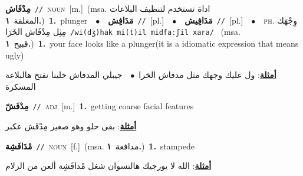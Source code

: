 \documentclass[10pt,a4paper,twoside]{article} %
\begin{document}
\begin{multicols}{2}
{\setlength\topsep{0pt}\textbf{\foreignlanguage{arabic}{مِدْفَاش}}\ {\color{gray}\texttt{//}\color{black}}\ \textsc{noun}\ [m.]\ \color{gray}(msa. \foreignlanguage{arabic}{اداة تستخدم لتنظيف البلاعات المغلقة}~\foreignlanguage{arabic}{\textbf{١.}})\color{black}\ \textbf{1.}~plunger\ \ $\bullet$\ \ \setlength\topsep{0pt}\textbf{\foreignlanguage{arabic}{مَدَافِش}}\ {\color{gray}\texttt{//}\color{black}}\ [pl.]\ \ $\bullet$\ \ \setlength\topsep{0pt}\textbf{\foreignlanguage{arabic}{مَدَافِيش}}\ {\color{gray}\texttt{//}\color{black}}\ [pl.]\ \ $\bullet$\ \ \textsc{ph.} \color{gray} \foreignlanguage{arabic}{وِجْهَك مِثِل مِدْفَاش الخَرَا}\color{black}\ {\color{gray}\texttt{/{\sffamily wi(dʒ)hak mi(t)il midfaːʃil xara}/}\color{black}}\ \color{gray} (msa. \foreignlanguage{arabic}{قبيح}~\foreignlanguage{arabic}{\textbf{١.}})\color{black}\ \textbf{1.}~your face looks like a plunger(it is a idiomatic expression that means ugly)\  \begin{flushright}\color{gray}\foreignlanguage{arabic}{\textbf{\underline{\foreignlanguage{arabic}{أمثلة}}}: ول عليك وجهك مثل مدفاش الخرا\ $\bullet$\ \  جيبلي المدفاش خلينا نفتح هالبلاعة المسكرة}\end{flushright}\color{black}} \vspace{2mm}

{\setlength\topsep{0pt}\textbf{\foreignlanguage{arabic}{مِدْفَشّ}}\ {\color{gray}\texttt{//}\color{black}}\ \textsc{adj}\ [m.]\ \textbf{1.}~getting coarse facial features\  \begin{flushright}\color{gray}\foreignlanguage{arabic}{\textbf{\underline{\foreignlanguage{arabic}{أمثلة}}}: بقى حلو وهو صغير مِدْفَش عكبر}\end{flushright}\color{black}} \vspace{2mm}

{\setlength\topsep{0pt}\textbf{\foreignlanguage{arabic}{مْدَافَشِة}}\ {\color{gray}\texttt{//}\color{black}}\ \textsc{noun}\ [f.]\ \color{gray}(msa. \foreignlanguage{arabic}{مدافعة}~\foreignlanguage{arabic}{\textbf{١.}})\color{black}\ \textbf{1.}~stampede\  \begin{flushright}\color{gray}\foreignlanguage{arabic}{\textbf{\underline{\foreignlanguage{arabic}{أمثلة}}}: الله لا يورجيك هالنسوان شغل مْدافَشِة ألعن من الزلام}\end{flushright}\color{black}} \vspace{2mm}


\end{multicols}
\end{document}
